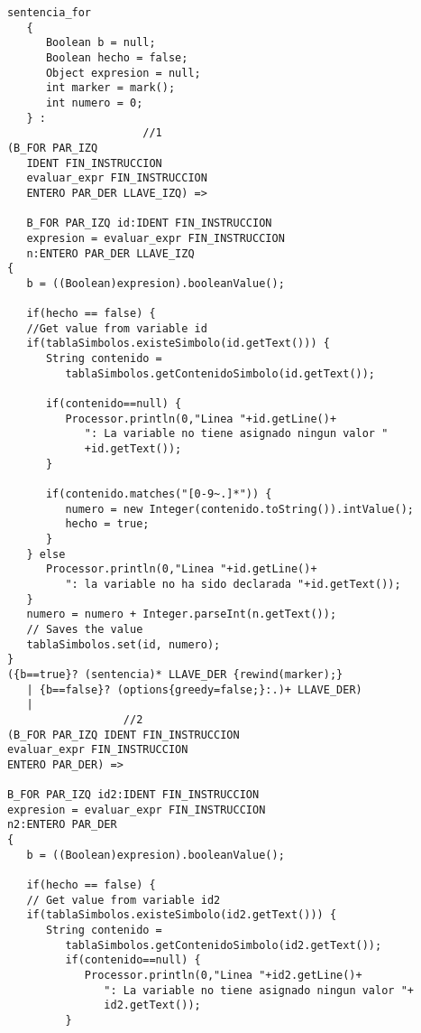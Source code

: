    \begin{lstlisting}
      sentencia_for
         {
            Boolean b = null; 
            Boolean hecho = false;
            Object expresion = null; 
            int marker = mark();
            int numero = 0;
         } :
                           //1
      (B_FOR PAR_IZQ 
         IDENT FIN_INSTRUCCION 
         evaluar_expr FIN_INSTRUCCION 
         ENTERO PAR_DER LLAVE_IZQ) =>
      
         B_FOR PAR_IZQ id:IDENT FIN_INSTRUCCION 
         expresion = evaluar_expr FIN_INSTRUCCION 
         n:ENTERO PAR_DER LLAVE_IZQ
      {
         b = ((Boolean)expresion).booleanValue();
         
         if(hecho == false) {
         //Get value from variable id
         if(tablaSimbolos.existeSimbolo(id.getText())) {
            String contenido = 
               tablaSimbolos.getContenidoSimbolo(id.getText());
            
            if(contenido==null) {
               Processor.println(0,"Linea "+id.getLine()+
                  ": La variable no tiene asignado ningun valor "
                  +id.getText()); 
            }
            
            if(contenido.matches("[0-9~.]*")) {
               numero = new Integer(contenido.toString()).intValue();
               hecho = true;
            } 
         } else 
            Processor.println(0,"Linea "+id.getLine()+
               ": la variable no ha sido declarada "+id.getText());
         }   
         numero = numero + Integer.parseInt(n.getText());  
         // Saves the value
         tablaSimbolos.set(id, numero);
      } 
      ({b==true}? (sentencia)* LLAVE_DER {rewind(marker);}
         | {b==false}? (options{greedy=false;}:.)+ LLAVE_DER) 
         |
                        //2
      (B_FOR PAR_IZQ IDENT FIN_INSTRUCCION 
      evaluar_expr FIN_INSTRUCCION 
      ENTERO PAR_DER) => 
      
      B_FOR PAR_IZQ id2:IDENT FIN_INSTRUCCION 
      expresion = evaluar_expr FIN_INSTRUCCION 
      n2:ENTERO PAR_DER
      {
         b = ((Boolean)expresion).booleanValue();
         
         if(hecho == false) {
         // Get value from variable id2
         if(tablaSimbolos.existeSimbolo(id2.getText())) {
            String contenido =
               tablaSimbolos.getContenidoSimbolo(id2.getText());
               if(contenido==null) {
                  Processor.println(0,"Linea "+id2.getLine()+
                     ": La variable no tiene asignado ningun valor "+
                     id2.getText()); 
               }
            

\end{lstlisting}
